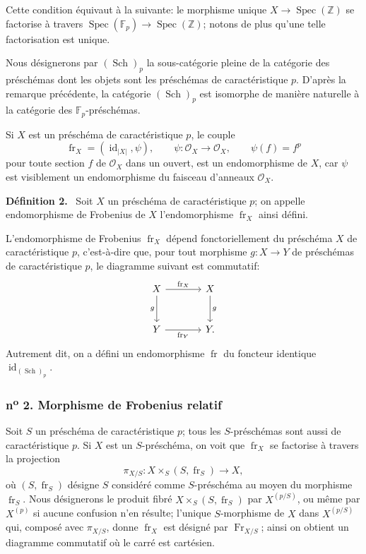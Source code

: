\documentclass[11pt]{article}
\newenvironment{statement}[1]{\par\medskip\noindent\textbf{#1.}\ }{\par\medskip}
\DeclareMathOperator{\Spec}{Spec}
\providecommand{\OO}{\mathcal{O}}
\providecommand{\id}{\operatorname{id}}
\providecommand{\id}{\operatorname{id}}
\providecommand{\id}{\operatorname{id}}
\providecommand{\id}{\operatorname{id}}
\providecommand{\Spec}{\operatorname{Spec}}
\providecommand{\Spec}{\operatorname{Spec}}
\providecommand{\id}{\operatorname{id}}
\providecommand{\Spec}{\operatorname{Spec}}
\providecommand{\fr}{\operatorname{fr}}
\providecommand{\Fr}{\operatorname{Fr}}
\providecommand{\Sch}{\operatorname{Sch}}
\providecommand{\bF}{\mathbb F}
\providecommand{\bbZ}{\mathbb Z}
\providecommand{\Fr}{\operatorname{Fr}}
\providecommand{\fr}{\operatorname{fr}}
\providecommand{\Sch}{\operatorname{Sch}}
\providecommand{\Spec}{\operatorname{Spec}}
\providecommand{\id}{\operatorname{id}}
\begin{document}
Cette condition équivaut à la suivante: le morphisme unique $X\to\Spec(\bbZ)$ se factorise à travers $\Spec(\bF_p)\to\Spec(\bbZ)$; notons de plus qu'une telle factorisation est unique.

Nous désignerons par $(\Sch)_p$ la sous-catégorie pleine de la catégorie des préschémas dont les objets sont les préschémas de caractéristique $p$. D'après la remarque précédente, la catégorie $(\Sch)_p$ est isomorphe de manière naturelle à la catégorie des $\bF_p$-préschémas.

Si $X$ est un préschéma de caractéristique $p$, le couple
\[
\fr_X=(\id_{|X|},\psi),
\qquad \psi:\OO_X\longrightarrow\OO_X,
\qquad \psi(f)=f^p
\]
pour toute section $f$ de $\OO_X$ dans un ouvert, est un endomorphisme de $X$, car $\psi$ est visiblement un endomorphisme du faisceau d'anneaux $\OO_X$.

\begin{statement}{Définition 2}
Soit $X$ un préschéma de caractéristique $p$; on appelle endomorphisme de Frobenius de $X$ l'endomorphisme $\fr_X$ ainsi défini.
\end{statement}

L'endomorphisme de Frobenius $\fr_X$ dépend fonctoriellement du préschéma $X$ de caractéristique $p$, c'est-à-dire que, pour tout morphisme $g:X\to Y$ de préschémas de caractéristique $p$, le diagramme suivant est commutatif:
\[
\begin{tikzcd}[column sep=large,row sep=large]
X \arrow[r,"\fr_X"] \arrow[d,"g"'] & X \arrow[d,"g"]\\
Y \arrow[r,"\fr_Y"'] & Y.
\end{tikzcd}
\]
Autrement dit, on a défini un endomorphisme $\fr$ du foncteur identique $\id_{(\Sch)_p}$.

\subsubsection*{n\textsuperscript{o} 2. Morphisme de Frobenius relatif}

Soit $S$ un préschéma de caractéristique $p$; tous les $S$-préschémas sont aussi de caractéristique $p$. Si $X$ est un $S$-préschéma, on voit que $\fr_X$ se factorise à travers la projection
\[
\pi_{X/S}:X\times_S(S,\fr_S)\longrightarrow X,
\]
où $(S,\fr_S)$ désigne $S$ considéré comme $S$-préschéma au moyen du morphisme $\fr_S$. Nous désignerons le produit fibré $X\times_S(S,\fr_S)$ par $X^{(p/S)}$, ou même par $X^{(p)}$ si aucune confusion n'en résulte; l'unique $S$-morphisme de $X$ dans $X^{(p/S)}$ qui, composé avec $\pi_{X/S}$, donne $\fr_X$ est désigné par $\Fr_{X/S}$; ainsi on obtient un diagramme commutatif où le carré est cartésien.
\end{document}
